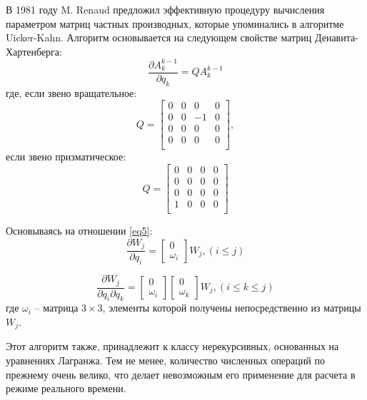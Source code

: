 В 1981 году M. Renaud предложил эффективную процедуру вычисления параметром матриц частных производных, которые упоминались в алгоритме Uicker-Kahn. Алгоритм основывается на следующем свойстве матриц Денавита-Хартенберга:
\begin{equation}\label{eq5}
\frac{\partial A_k^{k-1}}{\partial q_k} = Q A_k^{k-1}
\end{equation}
где, если звено вращательное:
\begin{equation}
Q = 
\begin{bmatrix}
0&0&0&0\\
0&0&-1&0\\
0&0&0&0\\
0&0&0&0\\
\end{bmatrix},
\end{equation} 
если звено призматическое:
\begin{equation}
Q = 
\begin{bmatrix}
0&0&0&0\\
0&0&0&0\\
0&0&0&0\\
1&0&0&0\\
\end{bmatrix}
\end{equation} 

Основываясь на отношении \ref{eq5}:
\begin{equation}
\frac{\partial W_j}{\partial q_i} = 
\begin{bmatrix}
0\\
\hline
\omega_i
\end{bmatrix}
W_j, (i \le j)
\end{equation}

\begin{equation}
\frac{\partial W_j}{\partial q_i \partial q_k} = 
\begin{bmatrix}
0\\
\hline
\omega_i
\end{bmatrix}
\begin{bmatrix}
0\\
\hline
\omega_k
\end{bmatrix}
W_j, (i \le k \le j)
\end{equation}
где $\omega_i$ -- матрица $3 \times 3$, элементы которой получены непосредственно из матрицы $W_j$.

Этот алгоритм также, принадлежит к классу нерекурсивных, основанных на уравнениях Лагранжа. Тем не менее, количество численных операций по прежнему очень велико, что делает невозможным его применение для расчета в режиме реального времени.

